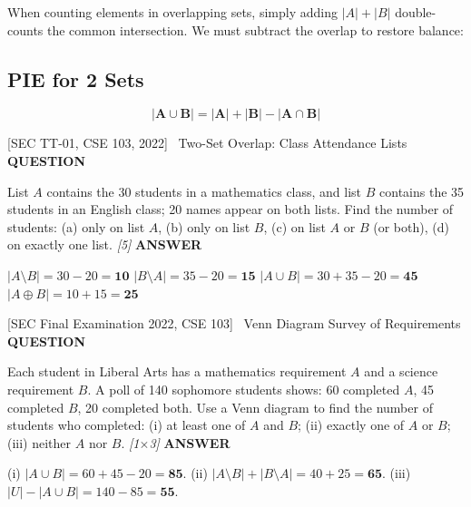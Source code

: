 \documentclass[11pt,a4paper]{article}
\newcommand{\Qlabel}{\textbf{\color{navy}\footnotesize\MakeUppercase{Question}}\par\smallskip}
\newcommand{\Alabel}{\textbf{\color{teal}\footnotesize\MakeUppercase{Answer}}\par\smallskip}
\begin{document}
When counting elements in overlapping sets, simply adding $|A| + |B|$ double-counts the common intersection. We must subtract the overlap to restore balance:

\subsection{PIE for 2 Sets}
\[
\mathbf{|A \cup B| = |A| + |B| - |A \cap B|}
\]

\begin{exambox}{[SEC TT-01, CSE 103, 2022] \ Two-Set Overlap: Class Attendance Lists}
\Qlabel
List $A$ contains the 30 students in a mathematics class, and list $B$ contains the 35 students in an English class; 20 names appear on both lists. Find the number of students: (a) only on list $A$, (b) only on list $B$, (c) on list $A$ or $B$ (or both), (d) on exactly one list. \hfill\textit{[5]}
\tcblower
\Alabel
$|A\setminus B| = 30-20 = \mathbf{10}$ \quad $|B\setminus A| = 35-20 = \mathbf{15}$ \quad $|A\cup B| = 30+35-20 = \mathbf{45}$ \quad $|A \oplus B| = 10+15 = \mathbf{25}$
\end{exambox}

\begin{exambox}{[SEC Final Examination 2022, CSE 103] \ Venn Diagram Survey of Requirements}
\Qlabel
Each student in Liberal Arts has a mathematics requirement $A$ and a science requirement $B$. A poll of 140 sophomore students shows: 60 completed $A$, 45 completed $B$, 20 completed both. Use a Venn diagram to find the number of students who completed: (i) at least one of $A$ and $B$; (ii) exactly one of $A$ or $B$; (iii) neither $A$ nor $B$. \hfill\textit{[1$\times$3]}
\tcblower
\Alabel
\begin{center}
\end{center}
(i) $|A \cup B| = 60+45-20 = \mathbf{85}$. \quad
(ii) $|A\setminus B|+|B\setminus A| = 40+25 = \mathbf{65}$. \quad
(iii) $|U|-|A\cup B| = 140-85 = \mathbf{55}$.
\end{exambox}
\end{document}
